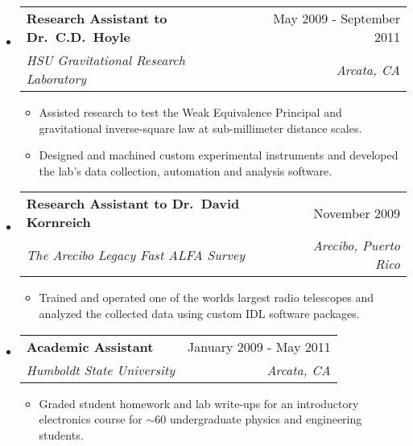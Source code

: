 \documentclass[letterpaper,11pt]{article}
\makeatletter
\newcommand{\resitem}[1]{\item #1 \vspace{-2pt}}
\newcommand{\ressubheading}[4]{
\begin{tabular*}{7.0in}{l@{\extracolsep{\fill}}r}
		\textbf{#1} & #2 \\
		\textit{#3} & \textit{#4} \\
\end{tabular*}\vspace{-6pt}}
\makeatother
\begin{document}
\begin{itemize}
\item
\ressubheading
{Research Assistant to Dr.\ C\@.D.\ Hoyle}
{May 2009 - September 2011}
{HSU Gravitational Research Laboratory}
{Arcata, CA}
\begin{itemize}
    \resitem
    {Assisted research to test the Weak Equivalence Principal and gravitational inverse-square law at sub-millimeter distance scales.}
    \resitem
    {Designed and machined custom experimental instruments and developed the lab's data collection, automation and analysis software.}
\end{itemize}

\item
\ressubheading
{Research Assistant to Dr.\ David Kornreich}
{November 2009}
{The Arecibo Legacy Fast ALFA Survey}
{Arecibo, Puerto Rico}
\begin{itemize}
    \resitem
    {Trained and operated one of the worlds largest radio telescopes and analyzed the collected data using custom IDL software packages.}
\end{itemize}

\item
\ressubheading
{Academic Assistant}
{January 2009 - May 2011}
{Humboldt State University}
{Arcata, CA}
\begin{itemize}
    \resitem{Graded student homework and lab write-ups for an introductory electronics course for $\sim$60 undergraduate physics and engineering students.}
\end{itemize}

\end{itemize}

\pagebreak[4]
\end{document}
